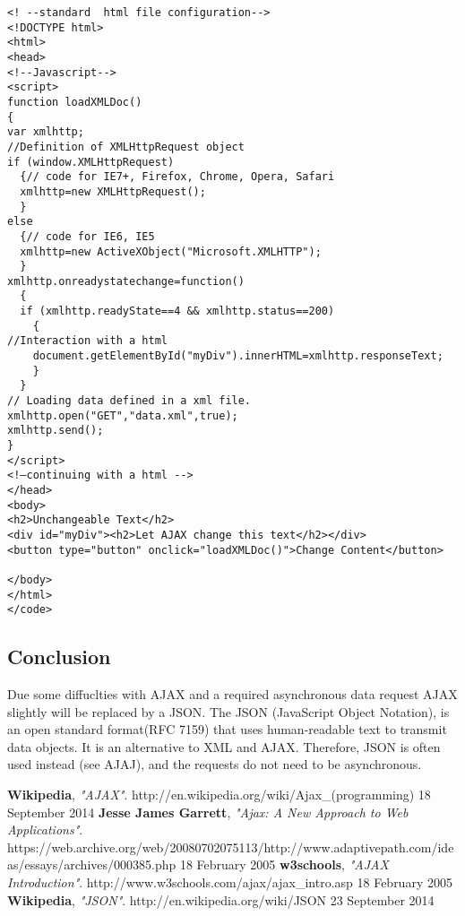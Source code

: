 \begin{lstlisting}
<! --standard  html file configuration-->
<!DOCTYPE html>
<html>
<head>
<!--Javascript-->
<script> 
function loadXMLDoc()
{
var xmlhttp;
//Definition of XMLHttpRequest object
if (window.XMLHttpRequest)
  {// code for IE7+, Firefox, Chrome, Opera, Safari
  xmlhttp=new XMLHttpRequest();
  }
else
  {// code for IE6, IE5
  xmlhttp=new ActiveXObject("Microsoft.XMLHTTP");
  }
xmlhttp.onreadystatechange=function()
  {
  if (xmlhttp.readyState==4 && xmlhttp.status==200)
    {
//Interaction with a html
    document.getElementById("myDiv").innerHTML=xmlhttp.responseText;
    }
  }
// Loading data defined in a xml file.
xmlhttp.open("GET","data.xml",true);
xmlhttp.send();
}
</script>
<!—continuing with a html -->
</head>
<body>
<h2>Unchangeable Text</h2> 
<div id="myDiv"><h2>Let AJAX change this text</h2></div>
<button type="button" onclick="loadXMLDoc()">Change Content</button>

</body>
</html>
</code>

\end{lstlisting}
\subsection{Conclusion}
Due some diffuclties with AJAX and a required asynchronous data request AJAX slightly will be replaced by a JSON.
The JSON (JavaScript Object Notation), is an open standard format(RFC 7159) that uses human-readable text to transmit data objects. It is an alternative to XML and AJAX. Therefore, JSON is often used instead (see AJAJ), and the requests do not need to be asynchronous.\cite {wk02}

\begin{thebibliography}{1}

   \textbf{Wikipedia},
   \emph{"AJAX"}.
   http://en.wikipedia.org/wiki/Ajax\_(programming)
   18 September 2014 
   \textbf{Jesse James Garrett},
   \emph{"Ajax: A New Approach to Web Applications"}.
   https://web.archive.org/web/20080702075113/http://www.adaptivepath.com/ideas/essays/archives/000385.php
   18 February 2005
   \textbf{w3schools},
   \emph{"AJAX Introduction"}.
   http://www.w3schools.com/ajax/ajax\_intro.asp
   18 February 2005
   \textbf{Wikipedia},
   \emph{"JSON"}.
   http://en.wikipedia.org/wiki/JSON
   23 September 2014

\end{thebibliography}
